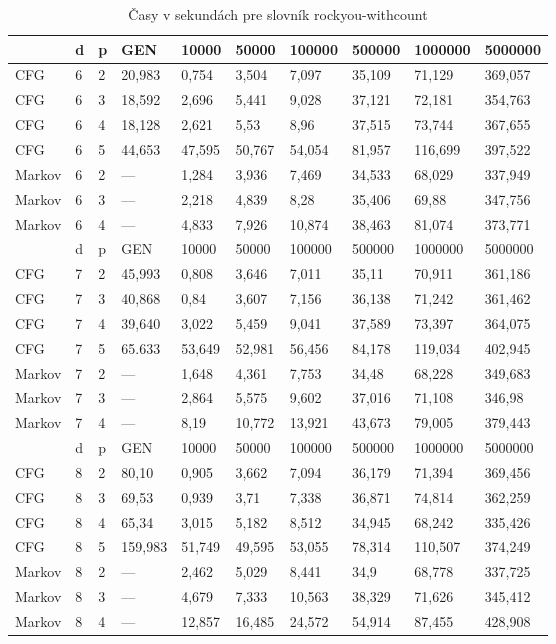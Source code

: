 \begin{table}[]
\centering
\caption{Časy v sekundách pre slovník rockyou-withcount}
\label{tbl:rockyouTime}
\begin{tabular}{lll|lllllll}
       & d & p & GEN     & 10000  & 50000  & 100000 & 500000 & 1000000 & 5000000 \\ \hline
CFG    & 6 & 2 & 20,983   & 0,754  & 3,504  & 7,097  & 35,109 & 71,129  & 369,057 \\
CFG    & 6 & 3 & 18,592    & 2,696  & 5,441  & 9,028  & 37,121 & 72,181  & 354,763 \\
CFG    & 6 & 4 & 18,128   & 2,621  & 5,53   & 8,96   & 37,515 & 73,744  & 367,655 \\
CFG    & 6 & 5 & 44,653 & 47,595 & 50,767 & 54,054 & 81,957 & 116,699 & 397,522 \\
Markov & 6 & 2 & ---     & 1,284  & 3,936  & 7,469  & 34,533 & 68,029  & 337,949 \\
Markov & 6 & 3 & ---     & 2,218  & 4,839  & 8,28   & 35,406 & 69,88   & 347,756 \\
Markov & 6 & 4 & ---     & 4,833  & 7,926  & 10,874 & 38,463 & 81,074  & 373,771 \\ \hline
       & d & p & GEN     & 10000  & 50000  & 100000 & 500000 & 1000000 & 5000000 \\ \hline
CFG    & 7 & 2 & 45,993    & 0,808  & 3,646  & 7,011  & 35,11  & 70,911  & 361,186 \\
CFG    & 7 & 3 & 40,868   & 0,84   & 3,607  & 7,156  & 36,138 & 71,242  & 361,462 \\
CFG    & 7 & 4 & 39,640   & 3,022  & 5,459  & 9,041  & 37,589 & 73,397  & 364,075 \\
CFG    & 7 & 5 & 65.633 & 53,649 & 52,981 & 56,456 & 84,178 & 119,034 & 402,945 \\
Markov & 7 & 2 & ---     & 1,648  & 4,361  & 7,753  & 34,48  & 68,228  & 349,683 \\
Markov & 7 & 3 & ---     & 2,864  & 5,575  & 9,602  & 37,016 & 71,108  & 346,98  \\
Markov & 7 & 4 & ---     & 8,19   & 10,772 & 13,921 & 43,673 & 79,005  & 379,443 \\ \hline
       & d & p & GEN     & 10000  & 50000  & 100000 & 500000 & 1000000 & 5000000 \\ \hline
CFG    & 8 & 2 & 80,10   & 0,905  & 3,662  & 7,094  & 36,179 & 71,394  & 369,456 \\
CFG    & 8 & 3 & 69,53   & 0,939  & 3,71   & 7,338  & 36,871 & 74,814  & 362,259 \\
CFG    & 8 & 4 & 65,34   & 3,015  & 5,182  & 8,512  & 34,945 & 68,242  & 335,426 \\
CFG    & 8 & 5 & 159,983 & 51,749 & 49,595 & 53,055 & 78,314 & 110,507 & 374,249 \\
Markov & 8 & 2 & ---     & 2,462  & 5,029  & 8,441  & 34,9   & 68,778  & 337,725 \\
Markov & 8 & 3 & ---     & 4,679  & 7,333  & 10,563 & 38,329 & 71,626  & 345,412 \\
Markov & 8 & 4 & ---     & 12,857 & 16,485 & 24,572 & 54,914 & 87,455  & 428,908
\end{tabular}
\end{table}


